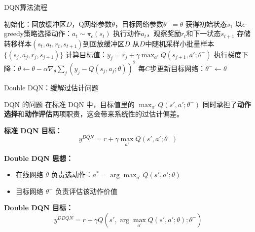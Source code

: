 \documentclass{beamer}
\begin{document}
\begin{frame}{DQN算法流程}
    \begin{algorithm}[H]
    \scriptsize
    \caption{DQN算法}
    \begin{algorithmic}[1]
    \STATE 初始化：回放缓冲区$D$，Q网络参数$\theta$，目标网络参数$\theta^- = \theta$
        \STATE 获得初始状态$s_1$ 
            \STATE 以$\epsilon$-greedy策略选择动作：$a_t \sim \pi_\epsilon(s_t)$ 
            \STATE 执行动作$a_t$，观察奖励$r_t$和下一状态$s_{t+1}$ 
            \STATE 存储转移样本$(s_t, a_t, r_t, s_{t+1})$到回放缓冲区$D$ 
            \STATE 从$D$中随机采样小批量样本$\{(s_j, a_j, r_j, s_{j+1})\}$ 
            \STATE 计算目标值：$y_j = r_j + \gamma \max_{a'} Q(s_{j+1}, a'; \theta^-)$ 
            \STATE 执行梯度下降：$\theta \leftarrow \theta - \alpha \nabla_\theta \sum_j (y_j - Q(s_j, a_j; \theta))^2$ 
            \STATE 每$C$步更新目标网络：$\theta^- \leftarrow \theta$ 
        \ENDFOR 
    \ENDFOR 
    \end{algorithmic} 
    \end{algorithm} 
\end{frame}

\begin{frame}{Double DQN：缓解过估计问题}
    \begin{block}{DQN 的问题}
        在标准 DQN 中，目标值里的 $\max_{a'} Q(s',a';\theta^-)$ 同时承担了\textbf{动作选择}和\textbf{动作评估}两项职责，这会带来系统性的过估计偏差。
    \end{block}

    \textbf{标准 DQN 目标：}
    \[
    y^{DQN} = r + \gamma \max_{a'} Q(s', a'; \theta^-)
    \]

    \textbf{Double DQN 思想：}
    \begin{itemize}
        \item 在线网络 $\theta$ 负责选动作：$a^* = \arg\max_{a'} Q(s',a';\theta)$
        \item 目标网络 $\theta^-$ 负责评估该动作价值
    \end{itemize}

    \textbf{Double DQN 目标：}
    \[
    y^{DDQN} = r + \gamma Q(s', \arg\max_{a'} Q(s',a';\theta); \theta^-)
    \]
\end{frame}
\end{document}
